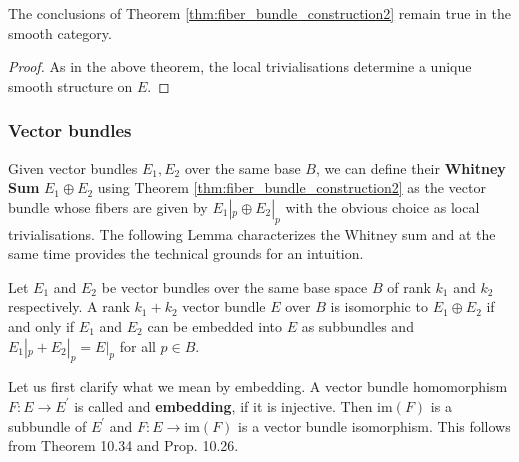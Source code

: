     \begin{theorem}
        \label{thm:fiber_bundle_construction2_smooth}
        The conclusions of Theorem \ref{thm:fiber_bundle_construction2} remain true in the smooth category. 
    \end{theorem}
    \begin{proof}
        As in the above theorem, the local trivialisations determine a unique smooth structure on $E$.
    \end{proof}

    \subsubsection{Vector bundles}


    Given vector bundles $E_1, E_2$ over the same base $B$, we can define their \textbf{Whitney Sum} $E_1 \oplus E_2$ using Theorem \ref{thm:fiber_bundle_construction2} as the vector bundle whose fibers are given by $E_1|_p \oplus E_2|_p$ with the obvious choice as local trivialisations. The following Lemma characterizes the Whitney sum and at the same time provides the technical grounds for an intuition.

    \begin{lemma}
        \label{lem:whitney_sum}
        Let $E_1$ and $E_2$ be vector bundles over the same base space $B$ of rank $k_1$ and $k_2$ respectively. A rank $k_1+k_2$ vector bundle $E$ over $B$ is isomorphic to $E_1 \oplus E_2$ if and only if $E_1$ and $E_2$ can be embedded into $E$ as subbundles and $E_1|_p + E_2|_p = E|_p$ for all $p \in B$.
    \end{lemma}

    Let us first clarify what we mean by embedding. A vector bundle homomorphism $F \colon E \to E^\prime$ is called and \textbf{embedding}, if it is injective. Then $\mathrm{im}(F)$ is a subbundle of $E^\prime$ and $F \colon E \to \mathrm{im}(F)$ is a vector bundle isomorphism. This follows from \cite{lee2011smooth} Theorem 10.34 and Prop. 10.26.

